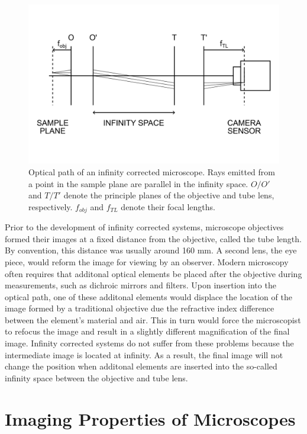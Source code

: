 \documentclass[10pt,a4paper]{book}
\begin{document}
\begin{figure}[ht]
    \centering
    \includegraphics{infinity-space.png}
    \caption{Optical path of an infinity corrected microscope. Rays emitted from a point in the sample plane are parallel in the infinity space. $O/O'$ and $T/T'$ denote the principle planes of the objective and tube lens, respectively. $f_{obj}$ and $f_{TL}$ denote their focal lengths.}
    \label{fig:infinity-space}
\end{figure}

Prior to the development of infinity corrected systems, microscope objectives formed their images at a fixed distance from the objective, called the tube length. By convention, this distance was usually around 160 mm. A second lens, the eye piece, would reform the image for viewing by an observer. Modern microscopy often requires that additonal optical elements be placed after the objective during measurements, such as dichroic mirrors and filters. Upon insertion into the optical path, one of these additonal elements would displace the location of the image formed by a traditional objective due the refractive index difference between the element's material and air. This in turn would force the microscopist to refocus the image and result in a slightly different magnification of the final image. Infinity corrected systems do not suffer from these problems because the intermediate image is located at infinity. As a result, the final image will not change the position when additonal elements are inserted into the so-called infinity space between the objective and tube lens.

\section{Imaging Properties of Microscopes}
\end{document}
